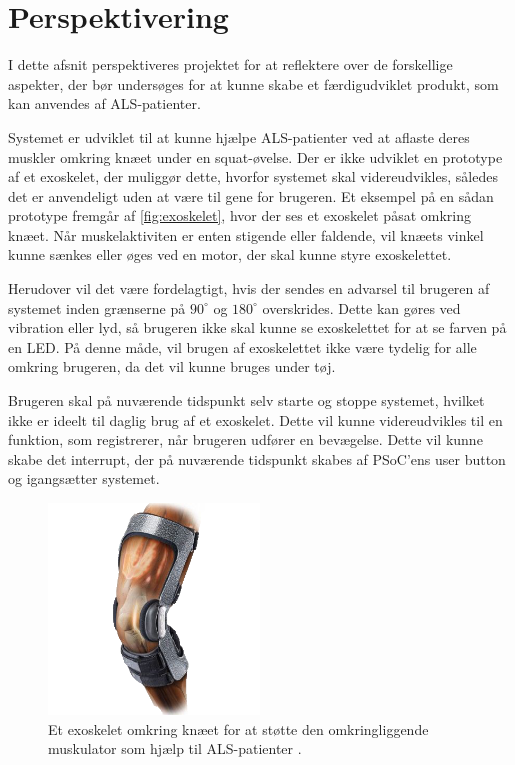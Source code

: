 \section{Perspektivering} \label{sec:perspektivering}
I dette afsnit perspektiveres projektet for at reflektere over de forskellige aspekter, der bør undersøges for at kunne skabe et færdigudviklet produkt, som kan anvendes af ALS-patienter. 

Systemet er udviklet til at kunne hjælpe ALS-patienter ved at aflaste deres muskler omkring knæet under en squat-øvelse. Der er ikke udviklet en prototype af et exoskelet, der muliggør dette, hvorfor systemet skal videreudvikles, således det er anvendeligt uden at være til gene for brugeren. Et eksempel på en sådan prototype fremgår af \autoref{fig:exoskelet}, hvor der ses et exoskelet påsat omkring knæet. Når muskelaktiviten er enten stigende eller faldende, vil knæets vinkel kunne sænkes eller øges ved en motor, der skal kunne styre exoskelettet.

Herudover vil det være fordelagtigt, hvis der sendes en advarsel til brugeren af systemet inden grænserne på $90^{\circ}$ og $180^{\circ}$ overskrides. Dette kan gøres ved vibration eller lyd, så brugeren ikke skal kunne se exoskelettet for at se farven på en LED. På denne måde, vil brugen af exoskelettet ikke være tydelig for alle omkring brugeren, da det vil kunne bruges under tøj.

Brugeren skal på nuværende tidspunkt selv starte og stoppe systemet, hvilket ikke er ideelt til daglig brug af et exoskelet. Dette vil kunne videreudvikles til en funktion, som registrerer, når brugeren udfører en bevægelse. Dette vil kunne skabe det interrupt, der på nuværende tidspunkt skabes af PSoC'ens user button og igangsætter systemet. 

\begin{figure}[H]
\centering
\includegraphics[width=0.5\textwidth]{figures/exoskelet}
\caption{Et exoskelet omkring knæet for at støtte den omkringliggende muskulator som hjælp til ALS-patienter \citep{djo}.}
\label{fig:exoskelet}
\end{figure}

